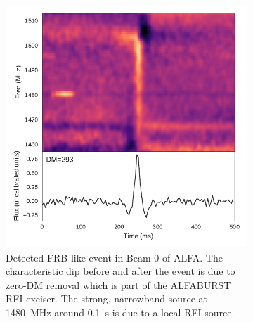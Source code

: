 \documentclass[a4paper,fleqn,usenatbib]{mnras}
\begin{document}
\begin{figure}
    \centering
    \begin{subfigure}[t]{0.45\textwidth}
        \centering\captionsetup{width=.95\linewidth}
        \includegraphics[width=1.0\textwidth]{figures/D20161204_buf23_Beam0.pdf}
        \caption{Detected FRB-like event in Beam 0 of ALFA. The characteristic
        dip before and after the event is due to zero-DM removal which is part
        of the ALFABURST RFI exciser. The strong, narrowband source at 1480~MHz
        around 0.1~s is due to a local RFI source.}
        \label{fig:beam0_dynamic_spec}
    \end{subfigure}
    \begin{subfigure}[t]{0.45\textwidth}
        \centering\captionsetup{width=.95\linewidth}

\end{subfigure}
\end{figure}
\end{document}
